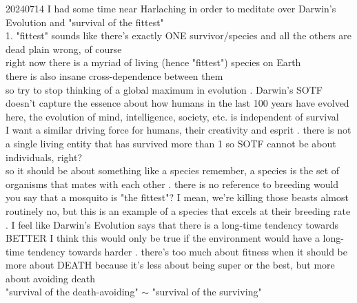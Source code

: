\documentclass{article}\usepackage[margin=2cm]{geometry}
\begin{document}
\begin{cascade}
    20240714
    \stepin
    I had some time near Harlaching in order to meditate over Darwin's Evolution and "survival of the fittest"\\[3pt]
    1. "fittest" sounds like there's exactly ONE survivor/species and all the others are dead
    \stepin
    plain wrong, of course\\
    right now there is a myriad of living (hence "fittest") species on Earth \\
    there is also insane cross-dependence between them \\
    so try to stop thinking of a global maximum in evolution
    . Darwin's SOTF doesn't capture the essence about how humans in the last 100 years have evolved
    \stepin
    here, the evolution of mind, intelligence, society, etc. is independent of survival\\
    I want a similar driving force for humans, their creativity and esprit
    . there is not a single living entity that has survived more than 1%
    \stepin
    so SOTF cannot be about individuals, right?\\
    so it should be about something like a species
    \stepin
    remember, a species is the set of organisms that mates with each other
    \stepout
    . there is no reference to breeding
    \stepin
    would you say that a mosquito is "the fittest"?
    \stepin
    I mean, we're killing those beasts almost routinely
    \stepout
    no, but this is an example of a species that excels at their breeding rate
    . I feel like Darwin's Evolution says that there is a long-time tendency towards BETTER
    \stepin
    I think this would only be true if the environment would have a long-time tendency towards harder
    . there's too much about fitness when it should be more about DEATH
    \stepin
    because it's less about being super or the best, but more about avoiding death\\
    "survival of the death-avoiding" $\sim$ "survival of the surviving"
\end{cascade}
\end{document}
